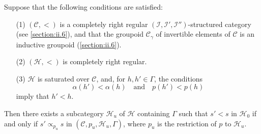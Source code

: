 \documentclass[a4paper,fleqn]{article}
\theoremstyle{plain}
\newenvironment{theorem}[1]
  {\renewcommand\theinnertheorem{#1}\innertheorem}
  {\endinnertheorem}
\theoremstyle{definition}
\newcommand{\oldpage}[1]{{\marginpar{\footnotesize$\bigg\vert$\,\,\,\,\textit{p.~#1}}}}
\newcommand{\textand}{\quad\text{and}\quad}
\newcommand{\CC}{\mathcal{C}}
\newcommand{\HH}{\mathcal{H}}
\newcommand{\subs}{\mathrel{\propto}}
\newcommand{\II}{\mathcal{I}}
\begin{document}
\begin{theorem}{4}
\label{theorem:i-4}
  Suppose that the following conditions are satisfied:
  \begin{enumerate}
    \item[\normalfont(1)]
      $(\CC,<)$ is a completely right regular $(\II,\II',\II'')$-structured category (see \cref{section:ii.6}), and that the groupoid $\CC_\gamma$ of invertible elements of $\CC$ is an inductive groupoid (\cref{section:ii.6}).

    \item[\normalfont(2)]
      $(\HH,<)$ is completely right regular.

    \item[\normalfont(3)]
      $\HH$ is saturated over $\CC$, and, for $h,h'\in\Gamma$, the conditions
      \[
        \alpha(h')<\alpha(h)
        \textand
        p(h')<p(h)
      \]
      imply that $h'<h$.
  \end{enumerate}

  \oldpage{377}
  Then there exists a subcategory $\HH_u$ of $\HH$ containing $\Gamma$ such that $s'<s$ in $\HH_0$ if and only if $s'\subs_{p_u}s$ in $(\CC,p_u,\HH_u,\Gamma)$, where $p_u$ is the restriction of $p$ to $\HH_u$.
\end{theorem}
\end{document}
